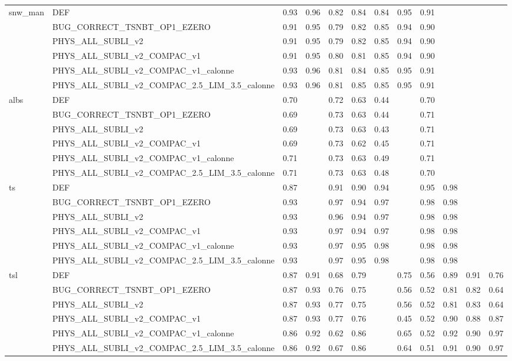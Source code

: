 \begin{tabular}{llllllllllll}
\cline{1-12}
\multirow[t]{6}{*}{snw_man} & DEF & 0.93 & 0.96 & 0.82 & 0.84 & 0.84 & 0.95 & 0.91 &  &  &  \\
 & BUG_CORRECT_TSNBT_OP1_EZERO & 0.91 & 0.95 & 0.79 & 0.82 & 0.85 & 0.94 & 0.90 &  &  &  \\
 & PHYS_ALL_SUBLI_v2 & 0.91 & 0.95 & 0.79 & 0.82 & 0.85 & 0.94 & 0.90 &  &  &  \\
 & PHYS_ALL_SUBLI_v2_COMPAC_v1 & 0.91 & 0.95 & 0.80 & 0.81 & 0.85 & 0.94 & 0.90 &  &  &  \\
 & PHYS_ALL_SUBLI_v2_COMPAC_v1_calonne & 0.93 & 0.96 & 0.81 & 0.84 & 0.85 & 0.95 & 0.91 &  &  &  \\
 & PHYS_ALL_SUBLI_v2_COMPAC_2.5_LIM_3.5_calonne & 0.93 & 0.96 & 0.81 & 0.85 & 0.85 & 0.95 & 0.91 &  &  &  \\
\cline{1-12}
\multirow[t]{6}{*}{albs} & DEF & 0.70 &  & 0.72 & 0.63 & 0.44 &  & 0.70 &  &  &  \\
 & BUG_CORRECT_TSNBT_OP1_EZERO & 0.69 &  & 0.73 & 0.63 & 0.44 &  & 0.71 &  &  &  \\
 & PHYS_ALL_SUBLI_v2 & 0.69 &  & 0.73 & 0.63 & 0.43 &  & 0.71 &  &  &  \\
 & PHYS_ALL_SUBLI_v2_COMPAC_v1 & 0.69 &  & 0.73 & 0.62 & 0.45 &  & 0.71 &  &  &  \\
 & PHYS_ALL_SUBLI_v2_COMPAC_v1_calonne & 0.71 &  & 0.73 & 0.63 & 0.49 &  & 0.71 &  &  &  \\
 & PHYS_ALL_SUBLI_v2_COMPAC_2.5_LIM_3.5_calonne & 0.71 &  & 0.73 & 0.63 & 0.48 &  & 0.70 &  &  &  \\
\cline{1-12}
\multirow[t]{6}{*}{ts} & DEF & 0.87 &  & 0.91 & 0.90 & 0.94 &  & 0.95 & 0.98 &  &  \\
 & BUG_CORRECT_TSNBT_OP1_EZERO & 0.93 &  & 0.97 & 0.94 & 0.97 &  & 0.98 & 0.98 &  &  \\
 & PHYS_ALL_SUBLI_v2 & 0.93 &  & 0.96 & 0.94 & 0.97 &  & 0.98 & 0.98 &  &  \\
 & PHYS_ALL_SUBLI_v2_COMPAC_v1 & 0.93 &  & 0.97 & 0.94 & 0.97 &  & 0.98 & 0.98 &  &  \\
 & PHYS_ALL_SUBLI_v2_COMPAC_v1_calonne & 0.93 &  & 0.97 & 0.95 & 0.98 &  & 0.98 & 0.98 &  &  \\
 & PHYS_ALL_SUBLI_v2_COMPAC_2.5_LIM_3.5_calonne & 0.93 &  & 0.97 & 0.95 & 0.98 &  & 0.98 & 0.98 &  &  \\
\cline{1-12}
\multirow[t]{6}{*}{tsl} & DEF & 0.87 & 0.91 & 0.68 & 0.79 &  & 0.75 & 0.56 & 0.89 & 0.91 & 0.76 \\
 & BUG_CORRECT_TSNBT_OP1_EZERO & 0.87 & 0.93 & 0.76 & 0.75 &  & 0.56 & 0.52 & 0.81 & 0.82 & 0.64 \\
 & PHYS_ALL_SUBLI_v2 & 0.87 & 0.93 & 0.77 & 0.75 &  & 0.56 & 0.52 & 0.81 & 0.83 & 0.64 \\
 & PHYS_ALL_SUBLI_v2_COMPAC_v1 & 0.87 & 0.93 & 0.77 & 0.76 &  & 0.45 & 0.52 & 0.90 & 0.88 & 0.87 \\
 & PHYS_ALL_SUBLI_v2_COMPAC_v1_calonne & 0.86 & 0.92 & 0.62 & 0.86 &  & 0.65 & 0.52 & 0.92 & 0.90 & 0.97 \\
 & PHYS_ALL_SUBLI_v2_COMPAC_2.5_LIM_3.5_calonne & 0.86 & 0.92 & 0.67 & 0.86 &  & 0.64 & 0.51 & 0.91 & 0.90 & 0.97 \\
\cline{1-12}
\bottomrule
\end{tabular}
